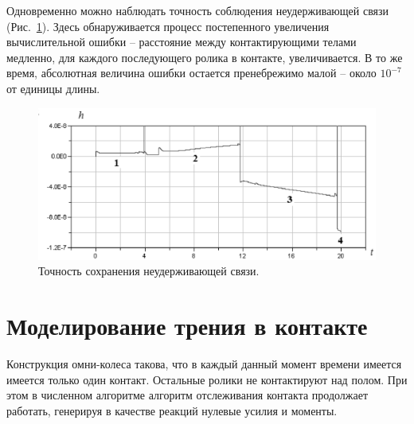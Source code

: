 Одновременно можно наблюдать точность соблюдения неудерживающей связи 
(Рис.~\ref{fig2}). Здесь обнаруживается процесс постепенного увеличения
вычислительной ошибки -- расстояние между контактирующими телами медленно, для
каждого последующего ролика в контакте, увеличивается. В то же время, 
абсолютная величина ошибки остается пренебрежимо малой -- около $10^{-7}$
от единицы длины. 

\begin{figure}[htb]
\centerline{\includegraphics[width=15cm]{content/parts/3_friction/nd/Figure21.eps}}
\caption{Точность сохранения неудерживающей связи.}
\label{fig2}
\end{figure}

\section{Моделирование трения в контакте}

Конструкция омни-колеса такова, что в каждый данный 
момент времени имеется имеется только один контакт. Остальные ролики не контактируют
над полом. При этом в численном алгоритме  алгоритм отслеживания контакта продолжает 
работать, генерируя в качестве реакций нулевые усилия и моменты.


